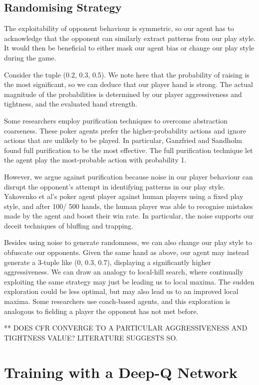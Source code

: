 \documentclass{article}
\begin{document}
\subsection{Randomising Strategy}

The exploitability of opponent behaviour is symmetric, so our agent has to acknowledge that the opponent can similarly extract patterns from our play style. It would then be beneficial to either mask our agent bias or change our play style during the game.

Consider the tuple (0.2, 0.3, 0.5). We note here that the probability of raising is the most significant, so we can deduce that our player hand is strong. The actual magnitude of the probabilities is determined by our player aggressiveness and tightness, and the evaluated hand strength.

Some researchers employ purification techniques to overcome abstraction coarseness. These poker agents prefer the higher-probability actions and ignore actions that are unlikely to be played. In particular, Ganzfried and Sandholm found full purification to be the most effective. The full purification technique let the agent play the most-probable action with probability 1.

However, we argue against purification because noise in our player behaviour can disrupt the opponent's attempt in identifying patterns in our play style. Yakovenko et al's poker agent player against human players using a fixed play style, and after 100/ 500 hands, the human player was able to recognise mistakes made by the agent and boost their win rate. In particular, the noise supports our deceit techniques of bluffing and trapping.

Besides using noise to generate randomness, we can also change our play style to obfuscate our opponents. Given the same hand as above, our agent may instead generate a 3-tuple like (0, 0.3, 0.7), displaying a significantly higher aggressiveness. We can draw an analogy to local-hill search, where continually exploiting the same strategy may just be leading us to local maxima. The sudden exploration could be less optimal, but may also lead us to an improved local maxima. Some researchers use coach-based agents, and this exploration is analogous to fielding a player the opponent has not met before.

** DOES CFR CONVERGE TO A PARTICULAR AGGRESSIVENESS AND TIGHTNESS VALUE? LITERATURE SUGGESTS SO.

\section{Training with a Deep-Q Network}
\end{document}
